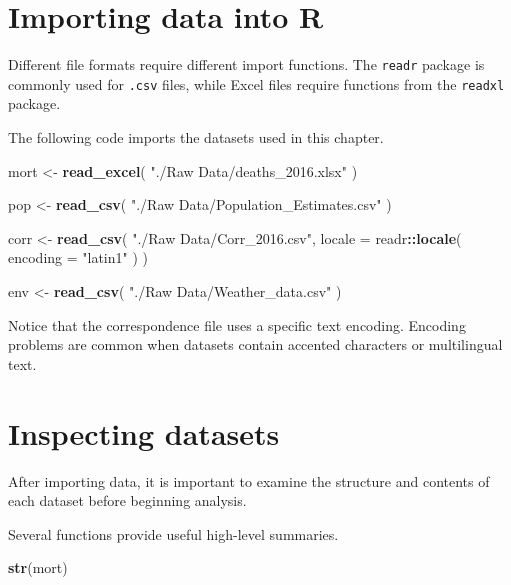 \documentclass[
  11pt,
  oneside]{book}
\newenvironment{Shaded}{\begin{snugshade}}{\end{snugshade}}
\newcommand{\AttributeTok}[1]{\textcolor[rgb]{0.13,0.29,0.53}{#1}}
\newcommand{\FunctionTok}[1]{\textcolor[rgb]{0.13,0.29,0.53}{\textbf{#1}}}
\newcommand{\NormalTok}[1]{#1}
\newcommand{\OtherTok}[1]{\textcolor[rgb]{0.56,0.35,0.01}{#1}}
\newcommand{\SpecialCharTok}[1]{\textcolor[rgb]{0.81,0.36,0.00}{\textbf{#1}}}
\newcommand{\StringTok}[1]{\textcolor[rgb]{0.31,0.60,0.02}{#1}}
\begin{document}
\section{Importing data into R}\label{importing-data-into-r}

Different file formats require different import functions. The \texttt{readr} package is commonly used for \texttt{.csv} files, while Excel files require functions from the \texttt{readxl} package.

The following code imports the datasets used in this chapter.

\begin{Shaded}
\begin{Highlighting}[]
\NormalTok{mort }\OtherTok{\textless{}{-}} \FunctionTok{read\_excel}\NormalTok{(}
  \StringTok{"./Raw Data/deaths\_2016.xlsx"}
\NormalTok{)}

\NormalTok{pop }\OtherTok{\textless{}{-}} \FunctionTok{read\_csv}\NormalTok{(}
  \StringTok{"./Raw Data/Population\_Estimates.csv"}
\NormalTok{)}

\NormalTok{corr }\OtherTok{\textless{}{-}} \FunctionTok{read\_csv}\NormalTok{(}
  \StringTok{"./Raw Data/Corr\_2016.csv"}\NormalTok{,}
  \AttributeTok{locale =}\NormalTok{ readr}\SpecialCharTok{::}\FunctionTok{locale}\NormalTok{(}
    \AttributeTok{encoding =} \StringTok{"latin1"}
\NormalTok{  )}
\NormalTok{)}

\NormalTok{env }\OtherTok{\textless{}{-}} \FunctionTok{read\_csv}\NormalTok{(}
  \StringTok{"./Raw Data/Weather\_data.csv"}
\NormalTok{)}
\end{Highlighting}
\end{Shaded}

Notice that the correspondence file uses a specific text encoding. Encoding problems are common when datasets contain accented characters or multilingual text.

\section{Inspecting datasets}\label{inspecting-datasets}

After importing data, it is important to examine the structure and contents of each dataset before beginning analysis.

Several functions provide useful high-level summaries.

\begin{Shaded}
\begin{Highlighting}[]
\FunctionTok{str}\NormalTok{(mort)}
\end{Highlighting}
\end{Shaded}
\end{document}
